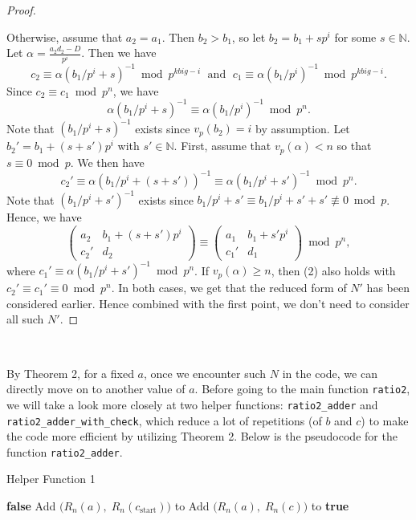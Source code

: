 \documentclass[letterpaper,12pt]{article}
\begin{document}
\begin{proof}
\

Otherwise, assume that $a_2 = a_1$. 
Then $b_2 > b_1$, so let $b_2 = b_1 + s p^i$ for some $s \in \mathbb{N}$.
Let $\alpha = \frac{a_2d_2-D}{p^i}$.
Then we have 
\[
c_2 \equiv \alpha (b_1 / p^i + s)^{-1} \bmod p^{kbig-i}\; \text{ and } \;
c_1 \equiv \alpha (b_1 / p^i)^{-1} \bmod p^{kbig-i}.
\]
Since $c_2 \equiv c_1 \bmod p^n$, we have
\[
\alpha (b_1 / p^i + s)^{-1} \equiv \alpha (b_1 / p^i)^{-1} \bmod p^n.
\]
Note that $(b_1 / p^i + s)^{-1}$ exists since $v_p(b_2) = i$ by assumption. 
Let $b_2' = b_1+ (s+s')p^i$ with $s' \in \mathbb{N}$.
First, assume that $v_p(\alpha) < n$ so that $s \equiv 0 \bmod p$.
We then have 
\[
c_2' \equiv \alpha (b_1 / p^i + (s+s'))^{-1} \equiv \alpha (b_1 / p^i + s')^{-1} \bmod p^n.
\]
Note that $(b_1/p^i + s')^{-1}$ exists since $b_1/p^i + s' \equiv b_1/p^i + s'+ s' \not\equiv 0 \bmod p$. 
Hence, we have 
\begin{equation}
\begin{pmatrix} a_2 & b_1 + (s+s')p^i \\ c_2' & d_2 \end{pmatrix}
\equiv \begin{pmatrix} a_1 & b_1 + s'p^i \\ c_1' & d_1 \end{pmatrix} \bmod p^n,
\end{equation}
where $c_1' \equiv \alpha (b_1 / p^i + s')^{-1} \bmod p^n$.
If $v_p(\alpha) \geq n$, then (2) also holds with $c_2' \equiv c_1' \equiv 0 \bmod p^n$.
In both cases, we get that the reduced form of $N'$ has been considered earlier.
Hence combined with the first point, we don't need to consider all such $N'$.

\end{proof}

\

By Theorem 2, for a fixed $a$, once we encounter such $N$ in the code,
we can directly move on to another value of $a$.
Before going to the main function \texttt{ratio2}, we will take a look more closely 
at two helper functions: \texttt{ratio2\_adder} and \texttt{ratio2\_adder\_with\_check},
which reduce a lot of repetitions (of $b$ and $c$) to make the code more efficient
by utilizing Theorem 2.
Below is the pseudocode for the function \texttt{ratio2\_adder}.

\begin{algorithm}[H]
\caption{Helper Function 1}
\begin{algorithmic}[1]
        \State \Return \textbf{false}
    \EndIf
    \State Add $\big( R_n(a),\; R_n(c_{\text{start}}) \big)$ to 
        \State Add $\big( R_n(a),\; R_n(c) \big)$ to 
    \EndFor
    \State \Return \textbf{true}
\EndFunction
\end{algorithmic}
\end{algorithm}
\end{document}
